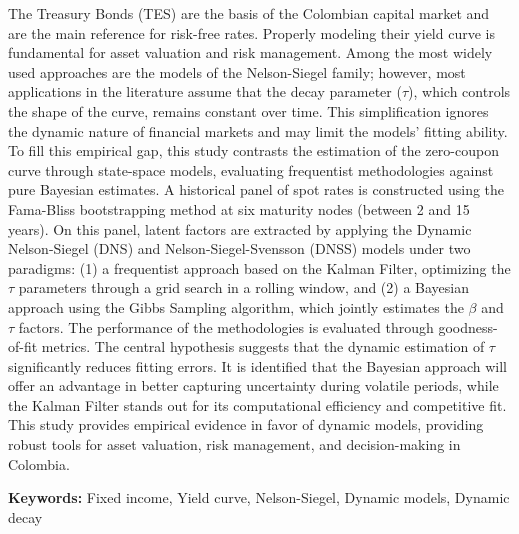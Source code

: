 \documentclass[article,10pt,twoside,a4paper,twocolumn,hidelinks,english,brazil]{abntex2}
\begin{document}
\renewcommand{\resumoname}{\texorpdfstring{\fontsize{14pt}{16.8pt} \fontfamily{ptm} \selectfont \textbf{Abstract} \\[-0.3cm] \rule{0.91\textwidth}{0.5pt} \vspace{-0.3cm}}{Resumo}}
\begin{resumoumacoluna}
    \normalsize
The Treasury Bonds (TES) are the basis of the Colombian capital market and are the main reference for risk-free rates. 
Properly modeling their yield curve is fundamental for asset valuation and risk management. Among the most widely used 
approaches are the models of the Nelson-Siegel family; however, most applications in the literature assume that the decay 
parameter ($\tau$), which controls the shape of the curve, remains constant over time. This simplification ignores the dynamic
nature of financial markets and may limit the models' fitting ability. 
\\

To fill this empirical gap, this study contrasts the estimation of the zero-coupon curve through state-space models,
evaluating frequentist methodologies against pure Bayesian estimates. A historical panel of spot rates is constructed using
the Fama-Bliss bootstrapping method at six maturity nodes (between 2 and 15 years). On this panel, latent factors are extracted by applying 
the Dynamic Nelson-Siegel (DNS) and Nelson-Siegel-Svensson (DNSS) models under two paradigms: (1) a frequentist approach based on the Kalman 
Filter, optimizing the $\tau$ parameters through a grid search in a rolling window, and (2) a Bayesian approach using the Gibbs Sampling algorithm, 
which jointly estimates the $\beta$ and $\tau$ factors. The performance of the methodologies is evaluated through goodness-of-fit metrics. The central 
hypothesis suggests that the dynamic estimation of $\tau$ significantly reduces fitting errors. It is identified that the Bayesian approach will offer
 an advantage in better capturing uncertainty during volatile periods, while the Kalman Filter stands out for its computational efficiency and competitive 
 fit. This study provides empirical evidence in favor of dynamic models, providing robust tools for asset valuation, risk management, and decision-making in Colombia.

\vspace{0.4cm}
    \noindent \textbf{Keywords:} Fixed income, Yield curve, Nelson-Siegel, Dynamic models,
                                  Dynamic decay

\end{resumoumacoluna}

\end{document}
